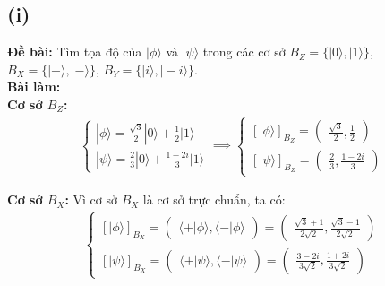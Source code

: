 \subsection{(i)}
\textbf{Đề bài:} Tìm tọa độ của $|\phi\rangle$ và $|\psi\rangle$ trong các cơ sở $B_{Z}=\{|0\rangle,|1\rangle\}$, $B_{X}=\{|+\rangle,|-\rangle\}$, $B_{Y}=\{|i\rangle,|-i\rangle\}$.\\
\textbf{Bài làm:}\\
\textbf{Cơ sở $B_{Z}$:}\\
\begin{align*}
    \begin{cases}
        |\phi\rangle = \frac{\sqrt{3}}{2}|0\rangle + \frac{1}{2}|1\rangle\\
        |\psi\rangle = \frac{2}{3}|0\rangle + \frac{1-2i}{3}|1\rangle
    \end{cases}
    \implies
    \begin{cases}
        [|\phi\rangle]_{B_{Z}} = \begin{pmatrix}
            \frac{\sqrt{3}}{2},
            \frac{1}{2}
        \end{pmatrix}\\
        [|\psi\rangle]_{B_{Z}} = \begin{pmatrix}
            \frac{2}{3},
            \frac{1-2i}{3}
        \end{pmatrix}
    \end{cases}
\end{align*}

\textbf{Cơ sở $B_{X}$:} Vì cơ sở $B_{X}$ là cơ sở trực chuẩn, ta có:
\begin{align*}
    \begin{cases}
        [|\phi\rangle]_{B_{X}} = \begin{pmatrix}
            \langle+|\phi\rangle,
            \langle-|\phi\rangle
        \end{pmatrix} = \begin{pmatrix}
            \frac{\sqrt{3} + 1}{2\sqrt{2}},
            \frac{\sqrt{3} - 1}{2\sqrt{2}}
        \end{pmatrix}\\
        [|\psi\rangle]_{B_{X}} = \begin{pmatrix}
            \langle+|\psi\rangle,
            \langle-|\psi\rangle
        \end{pmatrix} = \begin{pmatrix}
            \frac{3 - 2i}{3\sqrt{2}},
            \frac{1 + 2i}{3\sqrt{2}}
        \end{pmatrix}
    \end{cases}
\end{align*}

